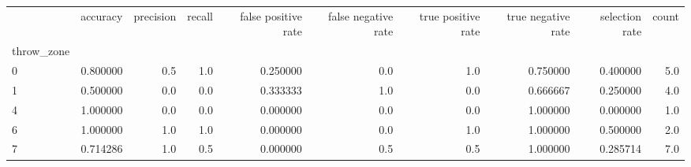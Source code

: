 \begin{tabular}{lrrrrrrrrr}
\toprule
{} &  accuracy &  precision &  recall &  false positive rate &  false negative rate &  true positive rate &  true negative rate &  selection rate &  count \\
throw\_zone &           &            &         &                      &                      &                     &                     &                 &        \\
\midrule
0          &  0.800000 &        0.5 &     1.0 &             0.250000 &                  0.0 &                 1.0 &            0.750000 &        0.400000 &    5.0 \\
1          &  0.500000 &        0.0 &     0.0 &             0.333333 &                  1.0 &                 0.0 &            0.666667 &        0.250000 &    4.0 \\
4          &  1.000000 &        0.0 &     0.0 &             0.000000 &                  0.0 &                 0.0 &            1.000000 &        0.000000 &    1.0 \\
6          &  1.000000 &        1.0 &     1.0 &             0.000000 &                  0.0 &                 1.0 &            1.000000 &        0.500000 &    2.0 \\
7          &  0.714286 &        1.0 &     0.5 &             0.000000 &                  0.5 &                 0.5 &            1.000000 &        0.285714 &    7.0 \\
\bottomrule
\end{tabular}
